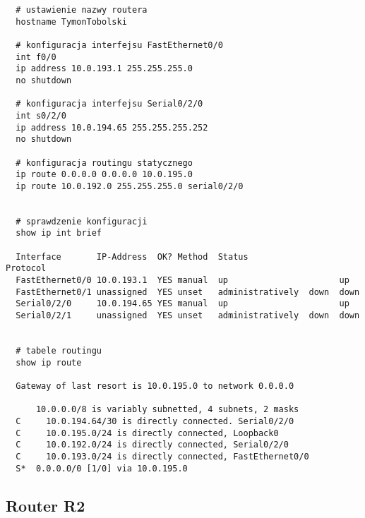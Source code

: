 \documentclass[wide,a4paper,titlepage,12pt] {article}
\begin{document}
  \begin{verbatim}
  # ustawienie nazwy routera
  hostname TymonTobolski

  # konfiguracja interfejsu FastEthernet0/0
  int f0/0
  ip address 10.0.193.1 255.255.255.0
  no shutdown

  # konfiguracja interfejsu Serial0/2/0
  int s0/2/0
  ip address 10.0.194.65 255.255.255.252
  no shutdown

  # konfiguracja routingu statycznego
  ip route 0.0.0.0 0.0.0.0 10.0.195.0
  ip route 10.0.192.0 255.255.255.0 serial0/2/0


  # sprawdzenie konfiguracji
  show ip int brief

  Interface       IP-Address  OK? Method  Status                  Protocol
  FastEthernet0/0 10.0.193.1  YES manual  up                      up
  FastEthernet0/1 unassigned  YES unset   administratively  down  down
  Serial0/2/0     10.0.194.65 YES manual  up                      up
  Serial0/2/1     unassigned  YES unset   administratively  down  down


  # tabele routingu
  show ip route

  Gateway of last resort is 10.0.195.0 to network 0.0.0.0

      10.0.0.0/8 is variably subnetted, 4 subnets, 2 masks
  C     10.0.194.64/30 is directly connected. Serial0/2/0
  C     10.0.195.0/24 is directly connected, Loopback0
  C     10.0.192.0/24 is directly connected, Serial0/2/0
  C     10.0.193.0/24 is directly connected, FastEthernet0/0
  S*  0.0.0.0/0 [1/0] via 10.0.195.0
 \end{verbatim}

  \subsection{Router R2}
\end{document}
